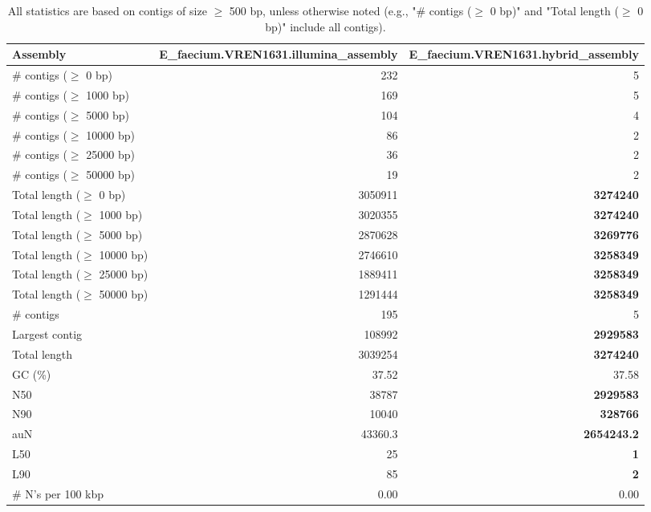 \documentclass[12pt,a4paper]{article}
\begin{document}
\begin{table}[ht]
\begin{center}
\caption{All statistics are based on contigs of size $\geq$ 500 bp, unless otherwise noted (e.g., "\# contigs ($\geq$ 0 bp)" and "Total length ($\geq$ 0 bp)" include all contigs).}
\begin{tabular}{|l*{2}{|r}|}
\hline
Assembly & E\_faecium.VREN1631.illumina\_assembly & E\_faecium.VREN1631.hybrid\_assembly \\ \hline
\# contigs ($\geq$ 0 bp) & 232 & 5 \\ \hline
\# contigs ($\geq$ 1000 bp) & 169 & 5 \\ \hline
\# contigs ($\geq$ 5000 bp) & 104 & 4 \\ \hline
\# contigs ($\geq$ 10000 bp) & 86 & 2 \\ \hline
\# contigs ($\geq$ 25000 bp) & 36 & 2 \\ \hline
\# contigs ($\geq$ 50000 bp) & 19 & 2 \\ \hline
Total length ($\geq$ 0 bp) & 3050911 & {\bf 3274240} \\ \hline
Total length ($\geq$ 1000 bp) & 3020355 & {\bf 3274240} \\ \hline
Total length ($\geq$ 5000 bp) & 2870628 & {\bf 3269776} \\ \hline
Total length ($\geq$ 10000 bp) & 2746610 & {\bf 3258349} \\ \hline
Total length ($\geq$ 25000 bp) & 1889411 & {\bf 3258349} \\ \hline
Total length ($\geq$ 50000 bp) & 1291444 & {\bf 3258349} \\ \hline
\# contigs & 195 & 5 \\ \hline
Largest contig & 108992 & {\bf 2929583} \\ \hline
Total length & 3039254 & {\bf 3274240} \\ \hline
GC (\%) & 37.52 & 37.58 \\ \hline
N50 & 38787 & {\bf 2929583} \\ \hline
N90 & 10040 & {\bf 328766} \\ \hline
auN & 43360.3 & {\bf 2654243.2} \\ \hline
L50 & 25 & {\bf 1} \\ \hline
L90 & 85 & {\bf 2} \\ \hline
\# N's per 100 kbp & 0.00 & 0.00 \\ \hline
\end{tabular}
\end{center}
\end{table}
\end{document}
